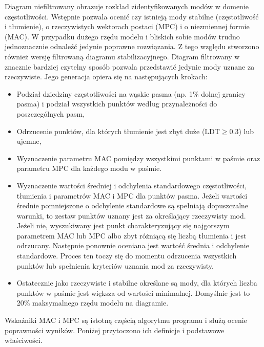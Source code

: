 Diagram niefiltrowany obrazuje rozkład zidentyfikowanych modów w domenie częstotliwości. Wstępnie pozwala ocenić czy istnieją mody stabilne (częstotliwość i tłumienie), o rzeczywistych wektorach postaci (MPC) i o niezmiennej formie (MAC). W przypadku dużego rzędu modelu i bliskich sobie modów trudno jednoznacznie odnaleźć jedynie poprawne rozwiązania. Z tego względu stworzono również wersję filtrowaną diagramu stabilizacyjnego. Diagram filtrowany w znacznie bardziej czytelny sposób pozwala przedstawić jedynie mody uznane za rzeczywiste. Jego generacja opiera się na następujących krokach:
\begin{itemize}[noitemsep]
	\item Podział dziedziny częstotliwości na wąskie pasma (np. 1\% dolnej granicy pasma) i podział wszystkich punktów według przynależności do poszczególnych pasm,
	\item Odrzucenie punktów, dla których tłumienie jest zbyt duże ($\text{LDT}\ge0.3$) lub ujemne,
	\item Wyznaczenie parametru MAC pomiędzy wszystkimi punktami w paśmie oraz parametru MPC dla każdego modu w paśmie.
	\item Wyznaczenie wartości średniej i odchylenia standardowego częstotliwości, tłumienia i parametrów MAC i MPC dla punktów pasma. Jeżeli wartości średnie pomniejszone o odchylenie standardowe są spełniają dopuszczalne warunki, to zestaw punktów uznany jest za określający rzeczywisty mod. Jeżeli nie, wyszukiwany jest punkt charakteryzujący się najgorszym parametrem MAC lub MPC albo zbyt różniącą się liczbą tłumienia i jest odrzucany. Następnie ponownie oceniana jest wartość średnia i odchylenie standardowe. Proces ten toczy się do momentu odrzucenia wszystkich punktów lub spełnienia kryteriów uznania mod za rzeczywisty.
	\item Ostatecznie jako rzeczywiste i stabilne określane są mody, dla których liczba punktów w paśmie jest większa od wartości minimalnej. Domyślnie jest to 20\% maksymalnego rzędu modelu na diagramie.
\end{itemize}
Wskaźniki MAC i MPC są istotną częścią algorytmu programu i służą ocenie poprawności wyników. Poniżej przytoczono ich definicje i podstawowe właściwości. 

